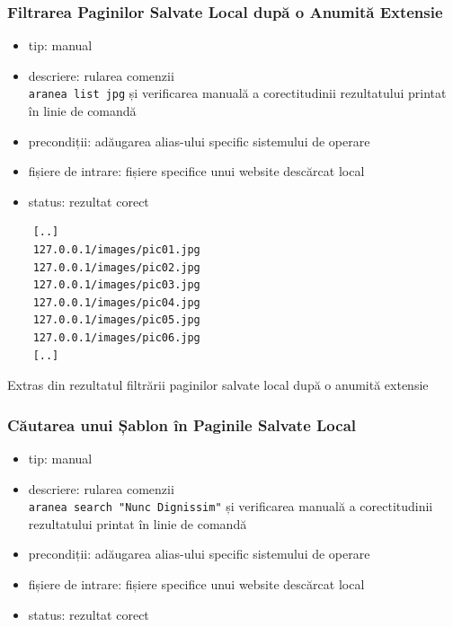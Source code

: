 \documentclass[12pt]{article}
\begin{document}
\subsubsection{Filtrarea Paginilor Salvate Local după o Anumită Extensie}

\begin{itemize}
    \item tip: manual
    \item descriere: rularea comenzii \\ \texttt{aranea list jpg} și verificarea manuală a corectitudinii rezultatului printat în linie de comandă
    \item precondiții: adăugarea alias-ului specific sistemului de operare
    \item fișiere de intrare: fișiere specifice unui website descărcat local
    \item status: rezultat corect
\end{itemize}

\vspace{0.3cm}
\begin{listing}[ht]
    \begin{verbatim}
	[..]
	127.0.0.1/images/pic01.jpg
	127.0.0.1/images/pic02.jpg
	127.0.0.1/images/pic03.jpg
	127.0.0.1/images/pic04.jpg
	127.0.0.1/images/pic05.jpg
	127.0.0.1/images/pic06.jpg
	[..]
    \end{verbatim}
    \caption{Extras din rezultatul filtrării paginilor salvate local după o anumită extensie}
    \label{listing:1}
\end{listing}
\vspace{0.3cm}

\subsubsection{Căutarea unui Șablon în Paginile Salvate Local}

\begin{itemize}
    \item tip: manual
    \item descriere: rularea comenzii \\ \texttt{aranea search "Nunc Dignissim"} și verificarea manuală a corectitudinii rezultatului printat în linie de comandă
    \item precondiții: adăugarea alias-ului specific sistemului de operare
    \item fișiere de intrare: fișiere specifice unui website descărcat local
    \item status: rezultat corect
\end{itemize}
\end{document}
